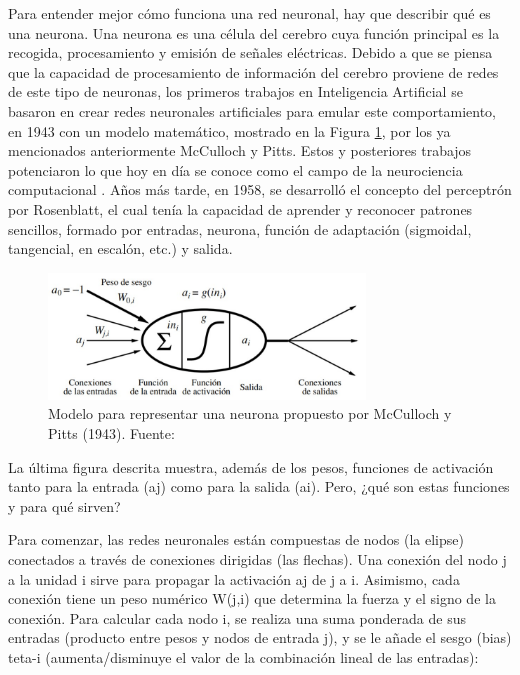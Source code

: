\begin{itemize}
	Para entender mejor cómo funciona una red neuronal, hay que describir qué es una neurona. Una neurona es una célula del cerebro cuya función principal es la recogida, procesamiento y emisión de señales eléctricas. Debido a que se piensa que la capacidad de procesamiento de información del cerebro proviene de redes de este tipo de neuronas, los primeros trabajos en Inteligencia Artificial se basaron en crear redes neuronales artificiales para emular este comportamiento, en 1943 con un modelo matemático, mostrado en la Figura \ref{2:fig11}, por los ya mencionados anteriormente McCulloch y Pitts. Estos y posteriores trabajos potenciaron lo que hoy en día se conoce como el campo de la neurociencia computacional \parencite{bk_russell2004intart}. Años más tarde, en 1958, se desarrolló el concepto del perceptrón por Rosenblatt, el cual tenía la capacidad de aprender y reconocer patrones sencillos, formado por entradas, neurona, función de adaptación (sigmoidal, tangencial, en escalón, etc.) y salida.
	\begin{figure}[h]
		\begin{center}
			\includegraphics[width=0.75\textwidth]{2/figures/rnn_mcculloch.jpg}
			\caption{Modelo para representar una neurona propuesto por McCulloch y Pitts (1943). Fuente: \cite{bk_russell2004intart}}
			\label{2:fig11}
		\end{center}
	\end{figure}
	
	La última figura descrita muestra, además de los pesos, funciones de activación tanto para la entrada (aj) como para la salida (ai). Pero, ¿qué son estas funciones y para qué sirven?
	
	Para comenzar, las redes neuronales están compuestas de nodos (la elipse) conectados a través de conexiones dirigidas (las flechas). Una conexión del nodo j a la unidad i sirve para propagar la activación aj de j a i. Asimismo, cada conexión tiene un peso numérico W(j,i) que determina la fuerza y el signo de la conexión. Para calcular cada nodo i, se realiza una suma ponderada de sus entradas (producto entre pesos y nodos de entrada j), y se le añade el sesgo (bias) teta-i (aumenta/disminuye el valor de la combinación lineal de las entradas):
	

\end{itemize}
